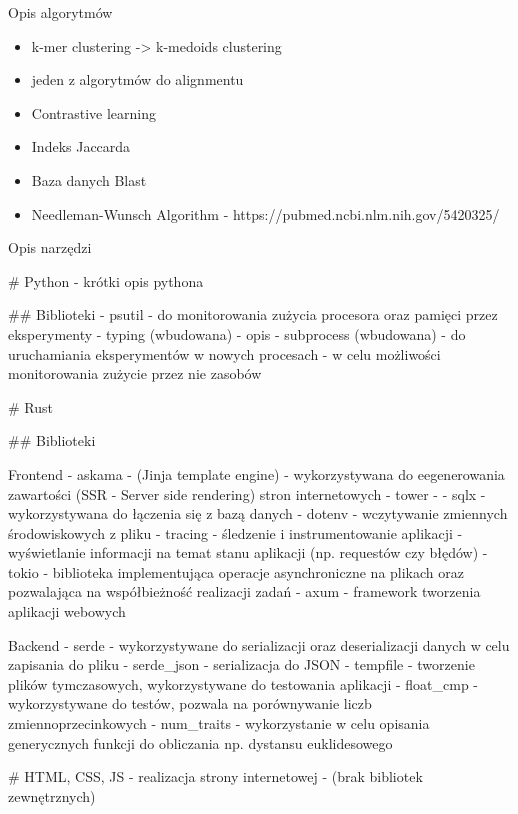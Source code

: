 Opis algorytmów
\begin{itemize}
    \item k-mer clustering      -> k-medoids clustering
    \item jeden z algorytmów do alignmentu
    \item Contrastive learning
    \item Indeks Jaccarda
    \item Baza danych Blast
    \item Needleman-Wunsch Algorithm - https://pubmed.ncbi.nlm.nih.gov/5420325/
\end{itemize}


Opis narzędzi

# Python
- {{ krótki opis pythona }}

## Biblioteki
- psutil - do monitorowania zużycia procesora oraz pamięci przez eksperymenty
- typing (wbudowana) - {{ opis }}
- subprocess (wbudowana) - do uruchamiania eksperymentów w nowych procesach - w celu możliwości monitorowania zużycie przez nie zasobów

# Rust

## Biblioteki

Frontend
- askama - (Jinja template engine) - wykorzystywana do eegenerowania zawartości (SSR - Server side rendering) stron internetowych
- tower -
- sqlx - wykorzystywana do łączenia się z bazą danych
- dotenv - wczytywanie zmiennych środowiskowych z pliku
- tracing - śledzenie i instrumentowanie aplikacji - wyświetlanie informacji na temat stanu aplikacji (np. requestów czy błędów)
- tokio - biblioteka implementująca operacje asynchroniczne na plikach oraz pozwalająca na współbieżność realizacji zadań
- axum - framework tworzenia aplikacji webowych

Backend
- serde - wykorzystywane do serializacji oraz deserializacji danych w celu zapisania do pliku
- serde_json - serializacja do JSON
- tempfile - tworzenie plików tymczasowych, wykorzystywane do testowania aplikacji
- float_cmp - wykorzystywane do testów, pozwala na porównywanie liczb zmiennoprzecinkowych
- num_traits - wykorzystanie w celu opisania generycznych funkcji do obliczania np. dystansu euklidesowego

# HTML, CSS, JS
- realizacja strony internetowej
- (brak bibliotek zewnętrznych)








